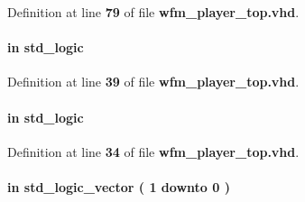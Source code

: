 Definition at line {\bf 79} of file {\bf wfm\+\_\+player\+\_\+top.\+vhd}.

\paragraph[{rcmd\+\_\+clk}]{ {\bfseries \textcolor{keywordflow}{in}\textcolor{vhdlchar}{ }} {\bfseries \textcolor{comment}{std\+\_\+logic}\textcolor{vhdlchar}{ }} \hspace{0.3cm}{\ttfamily [Port]}}\label{classwfm__player__top_a786c634c7706d2b15cba8b3621002f7a}


Definition at line {\bf 39} of file {\bf wfm\+\_\+player\+\_\+top.\+vhd}.

\paragraph[{reset\+\_\+n}]{ {\bfseries \textcolor{keywordflow}{in}\textcolor{vhdlchar}{ }} {\bfseries \textcolor{comment}{std\+\_\+logic}\textcolor{vhdlchar}{ }} \hspace{0.3cm}{\ttfamily [Port]}}\label{classwfm__player__top_a446ea52ed8c4a84181a47d9165ce41a5}


Definition at line {\bf 34} of file {\bf wfm\+\_\+player\+\_\+top.\+vhd}.

\paragraph[{sample\+\_\+width}]{ {\bfseries \textcolor{keywordflow}{in}\textcolor{vhdlchar}{ }} {\bfseries \textcolor{comment}{std\+\_\+logic\+\_\+vector}\textcolor{vhdlchar}{ }\textcolor{vhdlchar}{(}\textcolor{vhdlchar}{ }\textcolor{vhdlchar}{ } \textcolor{vhdldigit}{1} \textcolor{vhdlchar}{ }\textcolor{keywordflow}{downto}\textcolor{vhdlchar}{ }\textcolor{vhdlchar}{ } \textcolor{vhdldigit}{0} \textcolor{vhdlchar}{ }\textcolor{vhdlchar}{)}\textcolor{vhdlchar}{ }} \hspace{0.3cm}{\ttfamily [Port]}}\label{classwfm__player__top_aa4357f9a7d7e21fa49f9ce61eec07e23}


